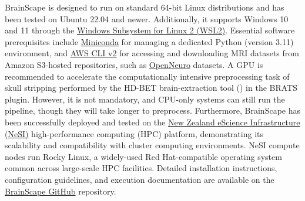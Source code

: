 BrainScape is designed to run on standard 64-bit Linux distributions and has been tested on Ubuntu 22.04 and newer. 
Additionally, it supports Windows 10 and 11 through the \href{https://learn.microsoft.com/en-gb/windows/wsl}{Windows Subsystem for Linux 2 (WSL2)}.
Essential software prerequisites include \href{https://www.anaconda.com/docs/getting-started/miniconda/main}{Miniconda} for managing 
a dedicated Python (version 3.11) environment, 
and \href{https://docs.aws.amazon.com/cli/latest/userguide/getting-started-install.html}{AWS CLI v2} for accessing and 
downloading MRI datasets from Amazon S3-hosted repositories, such as \href{https://openneuro.org/}{OpenNeuro} datasets. 
A GPU is recommended to accelerate the computationally intensive preprocessing task of skull stripping 
performed by the HD-BET brain-extraction tool (\cite{isensee2019automated}) in the BRATS plugin. 
However, it is not mandatory, and CPU-only systems can still run the pipeline, though they will take longer to preprocess.
Furthermore, BrainScape has been successfully deployed and tested on the 
\href{https://www.nesi.org.nz/}{New Zealand eScience Infrastructure (NeSI)} 
high-performance computing (HPC) platform, demonstrating its scalability and compatibility with cluster computing environments. 
NeSI compute nodes run Rocky Linux, a widely-used Red Hat-compatible operating system common across large-scale HPC facilities. 
Detailed installation instructions, configuration guidelines, and execution documentation are available on
the \href{https://github.com/yasinzaii/BrainScape}{BrainScape GitHub} repository.

